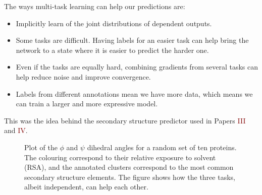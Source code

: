 The ways multi-task learning  can help our predictions are:
\begin{itemize}
	\item Implicitly learn of the joint distributions of dependent outputs.
	\item Some tasks are difficult.
	Having labels for an easier task can help bring the network to a state where it is easier to predict the harder one.
	\item Even if the tasks are equally hard, combining gradients from several tasks can help reduce noise and improve convergence.
	\item Labels from different annotations mean we have more data, which means we can train a larger and more expressive model.
\end{itemize}

This was the idea behind the secondary structure predictor used in Papers \textcolor{Maroon}{III} and \textcolor{Maroon}{IV}.

\begin{figure}[bht]
\centering
\caption{Plot of the $\phi$ and $\psi$ dihedral angles for a random set of ten proteins.
The colouring correspond to their relative exposure to solvent (RSA), 
and the annotated clusters correspond to the most common secondary structure elements.
The figure shows how the three tasks, albeit independent, can help each other. }\label{fig:transfer_learning}
\end{figure}

